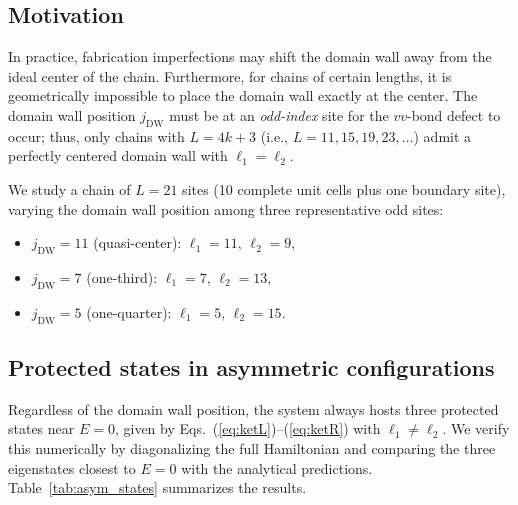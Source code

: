 \documentclass[
  reprint,
  amsmath,
  amssymb,
  aps,
  prb,
  floatfix,
  longbibliography,
]{revtex4-2}
\begin{document}
\subsection{Motivation}
\label{sec:asym_motivation}

In practice, fabrication imperfections may shift the domain wall away from the
ideal center of the chain. Furthermore, for chains of certain lengths, it is
geometrically impossible to place the domain wall exactly at the center. The
domain wall position $j_{\mathrm{DW}}$ must be at an \emph{odd-index} site for
the $vv$-bond defect to occur; thus, only chains with $L = 4k + 3$ (i.e.,
$L = 11, 15, 19, 23, \ldots$) admit a perfectly centered domain wall with
$\ell_1 = \ell_2$.

We study a chain of $L = 21$ sites (10 complete unit cells plus one boundary
site), varying the domain wall position among three representative odd sites:
\begin{itemize}
  \item $j_{\mathrm{DW}} = 11$ (quasi-center): $\ell_1 = 11$, $\ell_2 = 9$,
  \item $j_{\mathrm{DW}} = 7$ (one-third): $\ell_1 = 7$, $\ell_2 = 13$,
  \item $j_{\mathrm{DW}} = 5$ (one-quarter): $\ell_1 = 5$, $\ell_2 = 15$.
\end{itemize}

\subsection{Protected states in asymmetric configurations}
\label{sec:asym_states}

Regardless of the domain wall position, the system always hosts three protected
states near $E = 0$, given by Eqs.~(\ref{eq:ketL})--(\ref{eq:ketR}) with
$\ell_1 \neq \ell_2$. We verify this numerically by diagonalizing the full
Hamiltonian and comparing the three eigenstates closest to $E = 0$ with the
analytical predictions. Table~\ref{tab:asym_states} summarizes the results.
\end{document}
